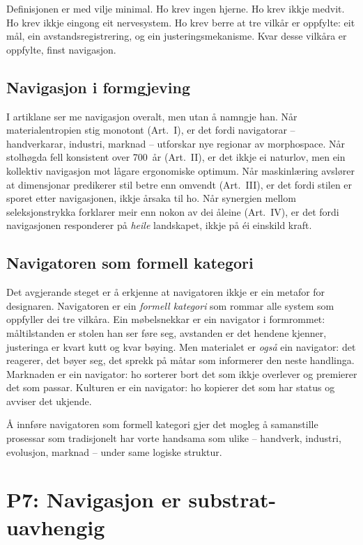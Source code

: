 \documentclass[12pt,a4paper,oneside]{report}
\begin{document}
Definisjonen er med vilje minimal. Ho krev ingen hjerne. Ho krev ikkje medvit. Ho krev ikkje eingong eit nervesystem. Ho krev berre at tre vilkår er oppfylte: eit mål, ein avstandsregistrering, og ein justeringsmekanisme. Kvar desse vilkåra er oppfylte, finst navigasjon.

\subsection{Navigasjon i formgjeving}

I artiklane ser me navigasjon overalt, men utan å namngje han. Når materialentropien stig monotont (Art.~I), er det fordi navigatorar -- handverkarar, industri, marknad -- utforskar nye regionar av morphospace. Når stolhøgda fell konsistent over 700~år (Art.~II), er det ikkje ei naturlov, men ein kollektiv navigasjon mot lågare ergonomiske optimum. Når maskinlæring avslører at dimensjonar predikerer stil betre enn omvendt (Art.~III), er det fordi stilen er sporet etter navigasjonen, ikkje årsaka til ho. Når synergien mellom seleksjonstrykka forklarer meir enn nokon av dei åleine (Art.~IV), er det fordi navigasjonen responderer på \emph{heile} landskapet, ikkje på éi einskild kraft.

\subsection{Navigatoren som formell kategori}

Det avgjerande steget er å erkjenne at navigatoren ikkje er ein metafor for designaren. Navigatoren er ein \emph{formell kategori} som rommar alle system som oppfyller dei tre vilkåra. Ein møbelsnekkar er ein navigator i formrommet: måltilstanden er stolen han ser føre seg, avstanden er det hendene kjenner, justeringa er kvart kutt og kvar bøying. Men materialet er \emph{også} ein navigator: det reagerer, det bøyer seg, det sprekk på måtar som informerer den neste handlinga. Marknaden er ein navigator: ho sorterer bort det som ikkje overlever og premierer det som passar. Kulturen er ein navigator: ho kopierer det som har status og avviser det ukjende.

Å innføre navigatoren som formell kategori gjer det mogleg å samanstille prosessar som tradisjonelt har vorte handsama som ulike -- handverk, industri, evolusjon, marknad -- under same logiske struktur.

\section{P7: Navigasjon er substrat-uavhengig}
\label{sec:p7}
\end{document}
